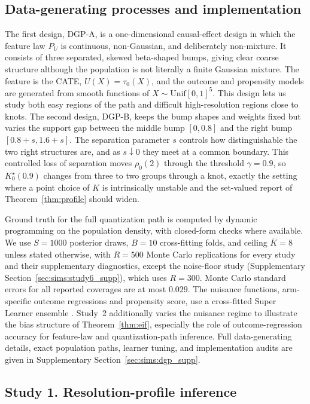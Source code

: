\documentclass[11pt]{article}
\begin{document}
\subsection{Data-generating processes and implementation}\label{sec:sims:dgp}

The first design, DGP-A, is a one-dimensional causal-effect design in which the feature law $P_U$ is continuous, non-Gaussian, and deliberately non-mixture. It consists of three separated, skewed beta-shaped bumps, giving clear coarse structure although the population is not literally a finite Gaussian mixture. The feature is the CATE, $U(X)=\tau_0(X)$, and the outcome and propensity models are generated from smooth functions of $X\sim\mathrm{Unif}[0,1]^5$.  This design lets us study both easy regions of the path and difficult high-resolution regions close to knots.
The second design, DGP-B, keeps the bump shapes and weights fixed but varies the support gap between the middle bump $[0,0.8]$ and the right bump $[0.8+s,1.6+s]$.  The separation parameter $s$ controls how distinguishable the two right structures are, and as $s\downarrow0$ they meet at a common boundary. This controlled loss of separation moves $\rho_0(2)$ through the threshold $\gamma=0.9$, so $K^\star_0(0.9)$ changes from three to two groups through a knot, exactly the setting where a point choice of $K$ is intrinsically unstable and the set-valued report of Theorem~\ref{thm:profile} should widen.

Ground truth for the full quantization path is computed by dynamic programming on the population density, with closed-form checks where available. We use $S=1000$ posterior draws, $B=10$ cross-fitting folds, and ceiling $\overline K=8$ unless stated otherwise, with $R=500$ Monte Carlo replications for every study and their supplementary diagnostics, except the noise-floor study (Supplementary Section~\ref{sec:sims:study6_supp}), which uses $R=300$. Monte Carlo standard errors for all reported coverages are at most $0.029$.  The nuisance functions, arm-specific outcome regressions and propensity score, use a cross-fitted Super Learner ensemble \citep{vanderlaan2007super}.  Study~2 additionally varies the nuisance regime to illustrate the bias structure of Theorem~\ref{thm:eif}, especially the role of outcome-regression accuracy for feature-law and quantization-path inference. Full data-generating details, exact population paths, learner tuning, and implementation audits are given in Supplementary Section~\ref{sec:sims:dgp_supp}.

\subsection{Study 1. Resolution-profile inference}\label{sec:sims:profile}
\end{document}
